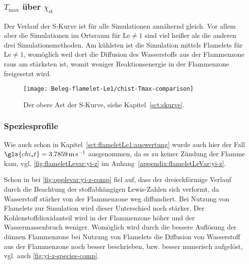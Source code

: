 \subsubsection{\texorpdfstring{$T_\mathrm{max}$}{Tmax} über \texorpdfstring{$\chi_\mathrm{st}$}{chist}}
\label{sct:cmp-Tmax-chist}

Der Verlauf der S-Kurve ist für alle Simulationen annähernd gleich. Vor allem aber die Simulationen im Ortsraum für $\mathrm{Le}\neq 1$ sind viel heißer als die anderen drei Simulationsmethoden. Am kühlsten ist die Simulation mittels Flamelets für $\mathrm{Le}\neq 1$, womöglich weil dort die Diffusion des Wasserstoffs aus der Flammenzone raus am stärksten ist, womit weniger Reaktionsenergie in der Flammenzone freigesetzt wird.

\begin{figure}[H]
    \begin{center}\begin{minipage}{0.6\linewidth}
        \texttt{[image: Beleg-flamelet-Le1/chist-Tmax-comparison]}
    \end{minipage}\end{center}
    \caption{Der obere Ast der S-Kurve, siehe Kapitel~\ref{sct:skurve}.}
\end{figure}

\subsubsection{Speziesprofile}

Wie auch schon in Kapitel~\ref{sct:flameletLe1:auswertung} wurde auch hier der Fall $\gls{chi_st}=\SI{3.7859}{\meter\per\second}$ ausgenommen, da es zu keiner Zündung der Flamme kam, vgl. \autoref{fig:flameletLevar:yi-z} im Anhang~\ref{appendix:flameletLeVar:yi-z}.

Schon in bei \autoref{fig:opplevar:yi-z-comp} fiel auf, dass der dreieckförmige Verlauf durch die Beachtung der stoffabhängigen Lewis-Zahlen sich verformt, da Wasserstoff stärker von der Flammenzone weg diffundiert. Bei Nutzung von Flamelets zur Simulation wird dieser Unterschied noch stärker. Der Kohlenstoffdioxidanteil wird in der Flammenzone höher und der Wassermassenbruch weniger. Womöglich wird durch die bessere Auflösung der dünnen Flammenzone bei Nutzung von Flamelets die Diffusion von Wasserstoff aus der Flammenzone noch besser beschrieben, bzw. besser numerisch aufgelöst, vgl. auch \autoref{fig:yi-z-species-comp}.

